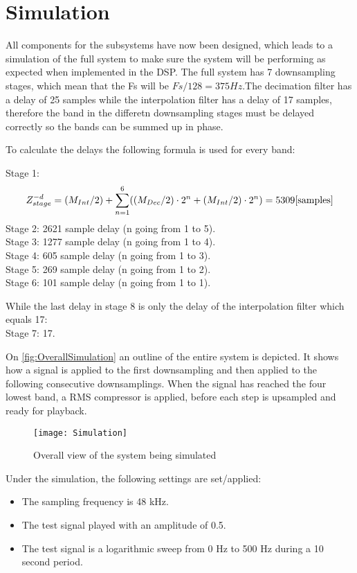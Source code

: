 \chapter{Simulation}
All components for the subsystems have now been designed, which leads to a simulation of the full system to make sure the system will be performing as expected when implemented in the DSP. The full system has 7 downsampling stages, which mean that the Fs will be $Fs/128=375 Hz$.The decimation filter has a delay of 25 samples  while the interpolation filter has a delay of 17 samples, therefore the band in the differetn downsampling stages must be delayed correctly so the bands can be summed up in phase. 

To calculate the delays the following formula is used for every band:

Stage 1:
\begin{equation}
Z^{-d}_{stage} = (M_{Int}/2) + \sum_{n=1}^{6} ((M_{Dec}/2)\cdot 2^n+(M_{Int}/2)\cdot 2^n) = 5309\enhed{samples}
\label{eq:delays}
\end{equation}
Stage 2: 2621 sample delay (n going from 1 to 5). \\
Stage 3: 1277 sample delay (n going from 1 to 4). \\
Stage 4: 605 sample delay (n going from 1 to 3). \\
Stage 5: 269 sample delay (n going from 1 to 2). \\
Stage 6: 101 sample delay (n going from 1 to 1). 

While the last delay in stage 8 is only the delay of the interpolation filter which equals 17: \\
Stage 7: 17.




On \autoref{fig:OverallSimulation} an outline of the entire system is depicted. It shows how a signal is applied to the first downsampling and then applied to the following consecutive downsamplings. When the signal has reached the four lowest band, a RMS compressor is applied, before each step is upsampled and ready for playback.

\begin{figure}[H]
\centering
\texttt{[image: Simulation]}
\label{fig:OverallSimulation}
\caption{Overall view of the system being simulated}
\end{figure}

Under the simulation, the following settings are set/applied:
\begin{itemize}
\item The sampling frequency is 48 kHz.
\item The test signal played with an amplitude of 0.5.
\item The test signal is a logarithmic sweep from 0 Hz to 500 Hz during a 10 second period.
\end{itemize}

